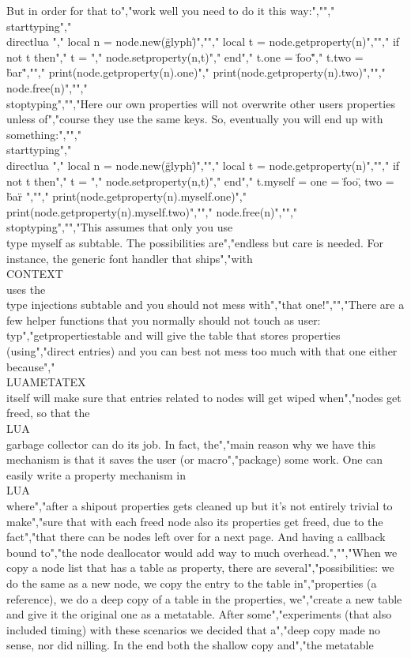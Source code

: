 But in order for that to","work well you need to do it this way:","","\\starttyping","\\directlua {","    local n = node.new(\"glyph\")","","    local t = node.getproperty(n)","","    if not t then","        t = { }","        node.setproperty(n,t)","    end","    t.one = \"foo\"","    t.two = \"bar\"","","    print(node.getproperty(n).one)","    print(node.getproperty(n).two)","","    node.free(n)","}","\\stoptyping","","Here our own properties will not overwrite other users properties unless of","course they use the same keys. So, eventually you will end up with something:","","\\starttyping","\\directlua {","    local n = node.new(\"glyph\")","","    local t = node.getproperty(n)","","    if not t then","        t = { }","        node.setproperty(n,t)","    end","    t.myself = { one = \"foo\", two = \"bar\" }","","    print(node.getproperty(n).myself.one)","    print(node.getproperty(n).myself.two)","","    node.free(n)","}","\\stoptyping","","This assumes that only you use \\type {myself} as subtable. The possibilities are","endless but care is needed. For instance, the generic font handler that ships","with \\CONTEXT\\ uses the \\type {injections} subtable and you should not mess with","that one!","","There are a few helper functions that you normally should not touch as user: \\typ","{getpropertiestable} and will give the table that stores properties (using","direct entries) and you can best not mess too much with that one either because","\\LUAMETATEX\\ itself will make sure that entries related to nodes will get wiped when","nodes get freed, so that the \\LUA\\ garbage collector can do its job. In fact, the","main reason why we have this mechanism is that it saves the user (or macro","package) some work. One can easily write a property mechanism in \\LUA\\ where","after a shipout properties gets cleaned up but it's not entirely trivial to make","sure that with each freed node also its properties get freed, due to the fact","that there can be nodes left over for a next page. And having a callback bound to","the node deallocator would add way to much overhead.","","When we copy a node list that has a table as property, there are several","possibilities: we do the same as a new node, we copy the entry to the table in","properties (a reference), we do a deep copy of a table in the properties, we","create a new table and give it the original one as a metatable. After some","experiments (that also included timing) with these scenarios we decided that a","deep copy made no sense, nor did nilling. In the end both the shallow copy and","the metatable 